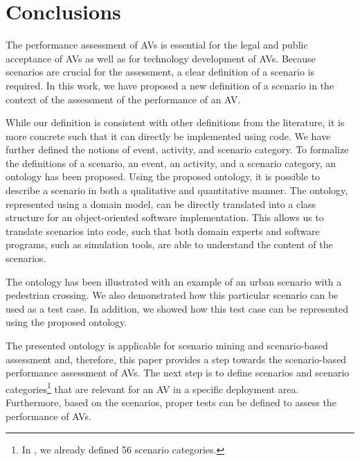 
\section{Conclusions}
\label{sec:conclusion}

The performance assessment of AVs is essential for the legal and public acceptance of AVs as well as for technology development of AVs. 
Because scenarios are crucial for the assessment, a clear definition of a scenario is required.
In this work, we have proposed a new definition of a scenario in the context of the assessment of the performance of an AV. 
 
While our definition is consistent with other definitions from the literature, it is more concrete such that it can directly be implemented using code.
We have further defined the notions of event, activity, and scenario category. 
To formalize the definitions of a scenario, an event, an activity, and a scenario category, an ontology has been proposed. Using the proposed ontology, it is possible to describe a scenario in both a qualitative and quantitative manner. The ontology, represented using a domain model, can be directly translated into a class structure for an object-oriented software implementation. This allows us to translate scenarios into code, such that both domain experts and software programs, such as simulation tools, are able to understand the content of the scenarios. 


The ontology has been illustrated with an example of an urban scenario with a pedestrian crossing. 
We also demonstrated how this particular scenario can be used as a test case. In addition, we showed how this test case can be represented using the proposed ontology.


The presented ontology is applicable for scenario mining \autocite{paardekooper2019dataset6000km} and scenario-based assessment \autocite{elrofai2018scenario} and, therefore, this paper provides a step towards the scenario-based performance assessment of AVs. The next step is to define scenarios and scenario categories\footnote{ In \autocite{degelder2019scenariocategories}, we already defined 56 scenario categories.} that are relevant for an AV in a specific deployment area. Furthermore, based on the scenarios, proper tests can be defined to assess the performance of AVs. 

